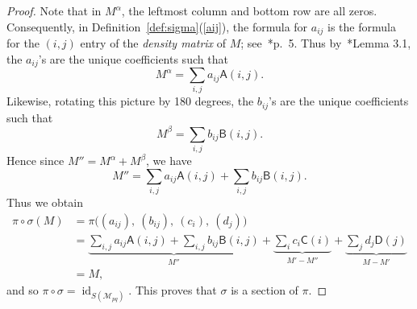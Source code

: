 \documentclass[noamsfonts,10pt]{amsart}
\newcommand{\M}{\mathcal{M}}
\newcommand{\al}{\alpha}
\newcommand{\be}{\beta}
\newcommand{\sA}{\mathsf{A}}
\newcommand{\sB}{\mathsf{B}}
\newcommand{\sC}{\mathsf{C}}
\newcommand{\sD}{\mathsf{D}}
\newcommand{\1}{\mathbf{1}}
\theoremstyle{plain}
\theoremstyle{definition}
\numberwithin{equation}{section}
\begin{document}
\begin{proof}
    Note that in $M^\al$, the leftmost column and bottom row are all zeros.
    Consequently, in Definition~\ref{def:sigma}(\ref{aij}), the formula for $a_{ij}$ is the formula for the $(i,j)$ entry of the \emph{density matrix} of $M$; see~\cite{Erickson25}*{p.~5}.
    Thus by~\cite{Erickson25}*{Lemma 3.1}, the $a_{ij}$'s are the unique coefficients such that
    \begin{equation}
        \label{M alpha is A's}
        M^\al = \sum_{i,j} a_{ij} \sA(i,j).
    \end{equation}
    Likewise, rotating this picture by 180 degrees, the $b_{ij}$'s are the unique coefficients such that
    \begin{equation}
        \label{M beta is B's}
        M^\be = \sum_{i,j} b_{ij} \sB(i,j).
    \end{equation}
    Hence since $M'' = M^\al + M^\be$, we have
    \[
        M'' = \sum_{i,j} a_{ij} \sA(i,j) + \sum_{i,j} b_{ij} \sB(i,j).
    \]
    Thus we obtain
    \begin{equation}
        \label{M decomposed}
        \begin{split}
        \pi \circ \sigma(M) & = \pi \Big( (a_{ij}), \: (b_{ij}), \: (c_i), \: (d_j) \Big) \\
        & = \underbrace{\sum_{i,j} a_{ij} \sA(i,j) + \sum_{i,j} b_{ij} \sB(i,j)}_{M''} + \underbrace{\sum_{i} c_{i} \sC(i)}_{M' - M''} + \underbrace{\sum_{j} d_{j} \sD(j)}_{M - M'} \\
        &= M,
        \end{split}
    \end{equation}
    and so $\pi \circ \sigma = \operatorname{id}_{S(\M_{pq})}$.
    This proves that $\sigma$ is a section of $\pi$.


\end{proof}
\end{document}
